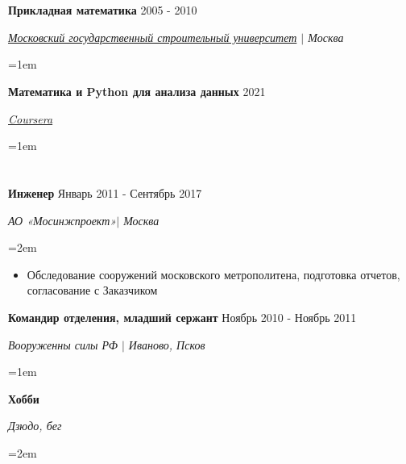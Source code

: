 \documentclass{article}
\newcommand{\NewPart}[1]{\section*{{\color{gray}{#1}}}}
\newcommand{\ExperienceEntry}[4]{
		\noindent \textbf{#1} \hfill  
		\hfill #2 \par  %
		\noindent \textit{#3} \par        %
\noindent  \text   \par    
		\noindent\hangindent=1em\hangafter=0 #4 %
		\normalsize \par}
\newcommand{\Other}[4]{
		\noindent \textbf{#1} \hfill  
		\hfill #2 \par  %
		\noindent \textit{#3} \par        %
		\noindent\hangindent=2em\hangafter=0  #4 %
		\normalsize \par}
\begin{document}
{}


\NewPart{Образование}{}

\ExperienceEntry
{Прикладная математика}
{2005 - 2010}
{\href{https://mgsu.ru/}
{Московский государственный строительный университет} $\vert$ Москва}
{}

\ExperienceEntry
{Математика и Python для анализа данных}
{2021}
{\href{https://www.coursera.org/account/accomplishments/certificate/DJ3RWF94PYUT}
{Coursera} }
{}

        

\NewPart{Дополнительно }{}
{	

\Other
{Инженер}
{Январь 2011 - Сентябрь 2017}
{АО  «Мосинжпроект»$\vert$ Москва}
{	
\begin{itemize}
	\item{Обследование сооружений московского метрополитена, подготовка отчетов, согласование с Заказчиком}
\end{itemize}
}

\ExperienceEntry
{Командир отделения, младший сержант}
{Ноябрь 2010 - Ноябрь 2011}
{Вооруженны силы РФ $\vert$ Иваново, Псков}
{	

\Other
{Хобби}
{ }
{Дзюдо, бег}


}
}
\end{document}
